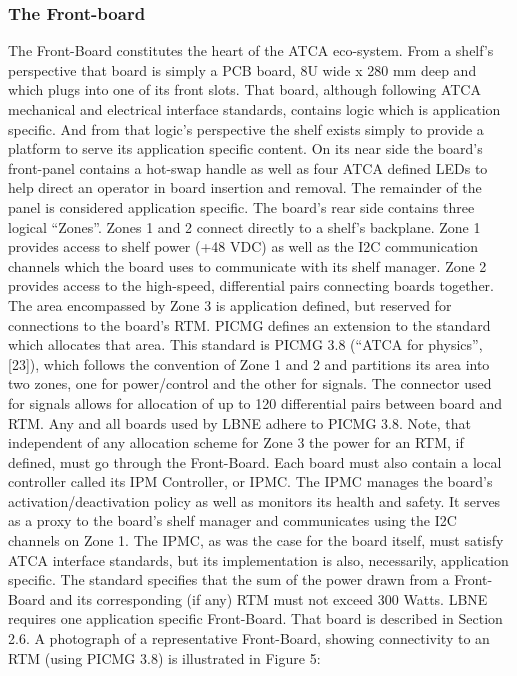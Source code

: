 \subsubsection{The Front-board}
\label{sec:frontboard}
The Front-Board constitutes the heart of the ATCA eco-system. From a shelf's perspective that board is simply a PCB board, 8U wide x 280 mm deep and which plugs into one of its front slots. That board, although following ATCA mechanical and electrical interface standards, contains logic which is application specific. And from that logic's perspective the shelf exists simply to provide a platform to serve its application specific content.
On its near side the board's front-panel contains a hot-swap handle as well as four ATCA defined LEDs to help direct an operator in board insertion and removal. The remainder of the panel is considered application specific. The board's rear side contains three logical “Zones”. Zones 1 and 2 connect directly to a shelf's backplane. Zone 1 provides access to shelf power (+48 VDC) as well as the I2C communication channels which the board uses to communicate with its shelf manager. Zone 2 provides access to the high-speed, differential pairs connecting boards together. The area encompassed by Zone 3 is application defined, but reserved for connections to the board's RTM. PICMG defines an extension to the standard which allocates
that area. This standard is PICMG 3.8 (“ATCA for physics”, [23]), which follows the convention of Zone 1 and 2 and partitions its area into two zones, one for power/control and the other for signals. The connector used for signals allows for allocation of up to 120 differential pairs between board and RTM.
Any and all boards used by LBNE adhere to PICMG 3.8.
Note, that independent of any allocation scheme for Zone 3 the power for an RTM, if defined, must go through the Front-Board.
Each board must also contain a local controller called its IPM Controller, or IPMC. The IPMC manages the board's activation/deactivation policy as well as monitors its health and safety. It serves as a proxy to the board's shelf manager and communicates using the I2C channels on Zone 1. The IPMC, as was the case for the board itself, must satisfy ATCA interface standards, but its implementation is also, necessarily, application specific.
The standard specifies that the sum of the power drawn from a Front-Board and its corresponding (if any) RTM must not exceed 300 Watts.
LBNE requires one application specific Front-Board. That board is described in Section 2.6.
A photograph of a representative Front-Board, showing connectivity to an RTM (using PICMG 3.8) is illustrated in Figure 5:

